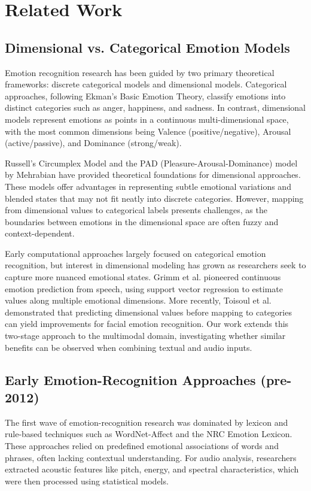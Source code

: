 \documentclass[12pt]{article}
\begin{document}
\section{Related Work}
\label{sec:related_work}
    
\subsection{Dimensional vs. Categorical Emotion Models}
Emotion recognition research has been guided by two primary theoretical frameworks: discrete categorical models and dimensional models. Categorical approaches, following Ekman's Basic Emotion Theory, classify emotions into distinct categories such as anger, happiness, and sadness. In contrast, dimensional models represent emotions as points in a continuous multi-dimensional space, with the most common dimensions being Valence (positive/negative), Arousal (active/passive), and Dominance (strong/weak).
    
Russell's Circumplex Model and the PAD (Pleasure-Arousal-Dominance) model by Mehrabian have provided theoretical foundations for dimensional approaches. These models offer advantages in representing subtle emotional variations and blended states that may not fit neatly into discrete categories. However, mapping from dimensional values to categorical labels presents challenges, as the boundaries between emotions in the dimensional space are often fuzzy and context-dependent.

Early computational approaches largely focused on categorical emotion recognition, but interest in dimensional modeling has grown as researchers seek to capture more nuanced emotional states. Grimm et al. pioneered continuous emotion prediction from speech, using support vector regression to estimate values along multiple emotional dimensions. More recently, Toisoul et al. demonstrated that predicting dimensional values before mapping to categories can yield improvements for facial emotion recognition. Our work extends this two-stage approach to the multimodal domain, investigating whether similar benefits can be observed when combining textual and audio inputs.

\subsection{Early Emotion-Recognition Approaches (pre-2012)}
The first wave of emotion-recognition research was dominated by lexicon and rule-based techniques such as WordNet-Affect and the NRC Emotion Lexicon. These approaches relied on predefined emotional associations of words and phrases, often lacking contextual understanding. For audio analysis, researchers extracted acoustic features like pitch, energy, and spectral characteristics, which were then processed using statistical models.
\end{document}
